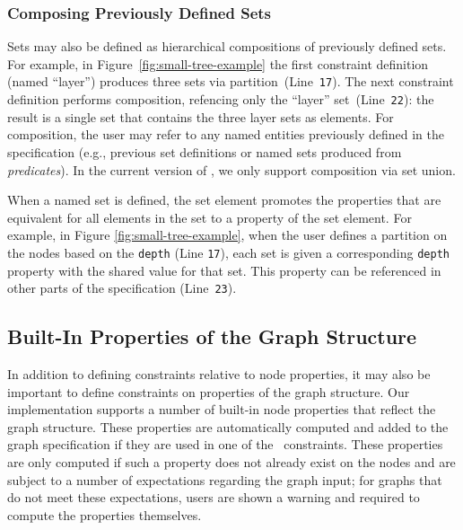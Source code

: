 \subsubsection{Composing Previously Defined Sets}

Sets may also be defined as hierarchical
compositions of previously defined sets. For example, in
Figure~\ref{fig:small-tree-example} the first constraint definition
(named ``layer'') produces three sets via
partition~(Line~\texttt{17}). The next constraint definition performs 
composition, refencing only the ``layer'' set~(Line~\texttt{22}): the result
is a single set that contains the three layer sets as elements.
For composition, the user may
refer to any named entities previously defined in the specification (e.g.,
previous set definitions or named sets produced from \emph{predicates}).
In the current version of \projectname, we only support composition via
set union.

When a named set is defined, the set element promotes the properties that
are equivalent for all elements in the set to a property of the set
element. For example, in Figure \ref{fig:small-tree-example}, when the user
defines a partition on the nodes based on the \texttt{depth} (Line
\texttt{17}), each set is given a corresponding \texttt{depth} property with
the shared value for that set. This property can be referenced in other 
parts of the \projectname specification (Line~\texttt{23}).

\subsection{Built-In Properties of the Graph Structure}

In addition to defining constraints relative to node properties, it may
also be important to define constraints on properties
of the graph structure. Our implementation supports a 
number of built-in node properties that reflect the graph structure.
These properties are automatically computed and added to the graph 
specification if they are used in one of the \projectname\ constraints. 
These properties are only computed if such a property does not
already exist on the nodes and are subject to a number of expectations
regarding the graph input; for graphs that do not meet these expectations,
users are shown a warning and required to compute the properties
themselves.


